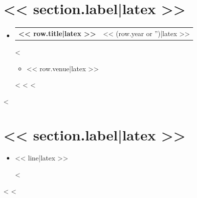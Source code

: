 \documentclass[letterpaper,11pt]{article}
\makeatletter
\newcommand{\resumeItem}[1]{
  \item\small{
    {#1 \vspace{-1pt}}
  }
}
\newcommand{\resumeProjectHeading}[2]{
    \item
    \begin{tabular*}{\textwidth}{l@{\extracolsep{\fill}}r}
      #1 & {\color{dark-grey} \small #2} \\
    \end{tabular*}\vspace{-4pt}
}
\newcommand{\resumeSubHeadingListStart}{\begin{itemize}[leftmargin=0in, label={}]}
\newcommand{\resumeSubHeadingListEnd}{\end{itemize}}
\newcommand{\resumeItemListStart}{\begin{itemize}}
\newcommand{\resumeItemListEnd}{\end{itemize}\vspace{0pt}}
\makeatother
\begin{document}
\section{<< section.label|latex >>}
  \resumeSubHeadingListStart
<%
<%
    \resumeProjectHeading
        {\textbf{<< row.title|latex >>}}{<< (row.year or '')|latex >>}
<%
        \resumeItemListStart
          \resumeItem{<< row.venue|latex >>}
        \resumeItemListEnd
<%
<%
<%
  \resumeSubHeadingListEnd
<%
\section{<< section.label|latex >>}
  \resumeSubHeadingListStart
    \resumeItemListStart
<%
      \resumeItem{<< line|latex >>}
<%
    \resumeItemListEnd
  \resumeSubHeadingListEnd
<%
<%
\end{document}
